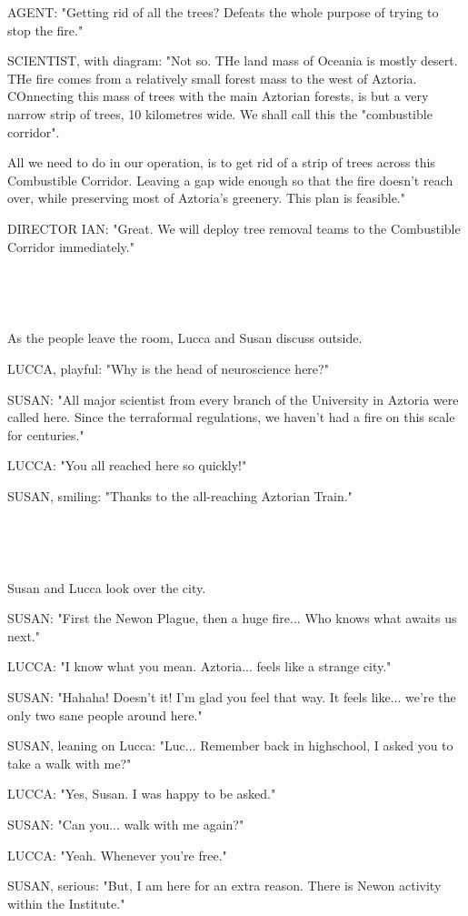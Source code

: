 \documentclass[11pt]{article}
\begin{document}
AGENT: "Getting rid of all the trees? Defeats the whole purpose of trying to stop the fire."

SCIENTIST, with diagram: "Not so.
THe land mass of Oceania is mostly desert.
THe fire comes from a relatively small forest mass to the west of Aztoria.
COnnecting this mass of trees with the main Aztorian forests, is but a very narrow strip of trees, 10 kilometres wide. 
We shall call this the "combustible corridor".

All we need to do in our operation, is to get rid of a strip of trees across this Combustible Corridor.
Leaving a gap wide enough so that the fire doesn't reach over, while preserving most of Aztoria's greenery.
This plan is feasible."

DIRECTOR IAN: "Great. We will deploy tree removal teams to the Combustible Corridor immediately."

\ 

\ 

As the people leave the room, Lucca and Susan discuss outside. 

LUCCA, playful: "Why is the head of neuroscience here?"

SUSAN: "All major scientist from every branch of the University in Aztoria were called here. 
Since the terraformal regulations, we haven't had a fire on this scale for centuries."

LUCCA: "You all reached here so quickly!"

SUSAN, smiling: "Thanks to the all-reaching Aztorian Train."

\ 

\ 

Susan and Lucca look over the city.

SUSAN: "First the Newon Plague, then a huge fire...
Who knows what awaits us next."

LUCCA: "I know what you mean. 
Aztoria... feels like a strange city."

SUSAN: "Hahaha! 
Doesn't it! 
I'm glad you feel that way.
It feels like... we're the only two sane people around here."

SUSAN, leaning on Lucca: "Luc...
Remember back in highschool, I asked you to take a walk with me?"

LUCCA: "Yes, Susan. I was happy to be asked."

SUSAN: "Can you... walk with me again?"

LUCCA: "Yeah. Whenever you're free."

SUSAN, serious: "But, I am here for an extra reason.
There is Newon activity within the Institute."
\end{document}
